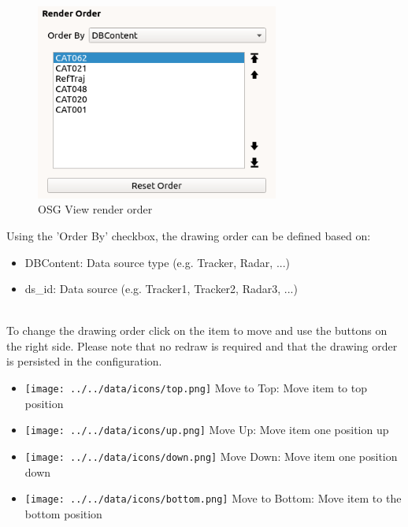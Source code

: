 \begin{figure}[H]
    \includegraphics[width=8cm,frame]{figures/osgview_render_order.png}
  \caption{OSG View render order}
\end{figure}

Using the 'Order By' checkbox, the drawing order can be defined based on:
\begin{itemize}
 \item DBContent: Data source type (e.g. Tracker, Radar, ...)
 \item ds\_id: Data source (e.g. Tracker1, Tracker2, Radar3, ...)
\end{itemize}
\ \\

To change the drawing order click on the item to move and use the buttons on the right side. Please note that no redraw is required and that the drawing order is persisted in the configuration. \\

 \begin{itemize}
 \item \texttt{[image: ../../data/icons/top.png]} Move to Top: Move item to top position
 \item \texttt{[image: ../../data/icons/up.png]} Move Up: Move item one position up
 \item \texttt{[image: ../../data/icons/down.png]} Move Down: Move item one position down
 \item \texttt{[image: ../../data/icons/bottom.png]} Move to Bottom: Move item to the bottom position
\end{itemize}
